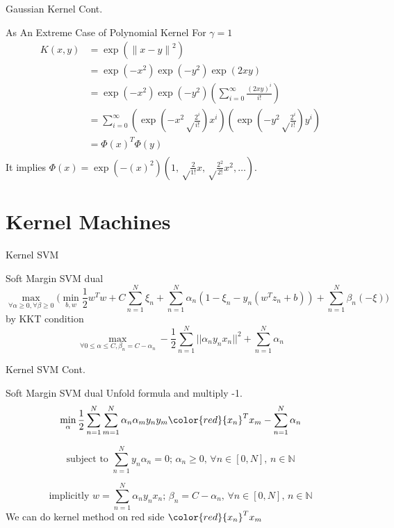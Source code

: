 \documentclass[10pt, compress]{beamer}
\begin{document}
\begin{frame}[fragile]{Gaussian Kernel Cont.}
  \begin{block}{As An Extreme Case of Polynomial Kernel}
    For \(\gamma = 1\)
    \begin{equation}
      \begin{split}
          K(x, y) &= \exp({\| x-y \|}^{2}) \\
                  &= \exp(-{x}^{2})\exp(-{y}^{2})\exp({2xy}) \\
                  &= \exp(-{x}^{2})\exp(-{y}^{2})(\sum_{i=0}^{\infty}\frac{{(2xy)}^{i}}{i!}) \\
                  &= \sum_{i=0}^{\infty}(\exp(-{x}^{2}\sqrt\frac{2^{i}}{i!}){x}^{i})(\exp(-{y}^{2}\sqrt\frac{2^{i}}{i!}){y}^{i}) \\
                  &= \Phi{(x)}^{T}\Phi(y)\\
      \end{split}
    \end{equation}
    It implies \(\Phi(x) = \exp(-{(x)}^{2})(1, \sqrt\frac{2}{1!}x, \sqrt\frac{2^{2}}{2!}x^{2}, \dots)\).
  \end{block}
\end{frame}

\section{Kernel Machines}

\begin{frame}[fragile]{Kernel SVM}
  \begin{block}{Soft Margin SVM dual}
    \[
      \max_{\forall \alpha \geq 0, \forall \beta \geq 0}\big(\min_{b, w} \frac{1}{2}{w}^{T}w + C\sum_{n=1}^{N}{\xi}_{n} + \sum_{n=1}^{N} {\alpha}_{n}(1-{\xi}_{n}-{y}_{n}({w}^{T}{z}_{n} + b)) + \sum_{n=1}^{N}{\beta}_{n}(-\xi)\big)
    \]
    by KKT condition
    \[
      \max_{\forall 0 \leq \alpha \leq C, {\beta}_{n} = C-\alpha_{n}} -\frac{1}{2}\sum_{n=1}^{N}{||{\alpha}_{n}y_{n}x_{n}||}^{2} + \sum_{n=1}^{N}{\alpha}_{n}
    \]
  \end{block}
\end{frame}

\begin{frame}[fragile]{Kernel SVM Cont.}
  \begin{block}{Soft Margin SVM dual}
    Unfold formula and multiply -1.
    \[
      \min_{\alpha} \frac{1}{2}\sum_{n=1}^{N}\sum_{m=1}^{N}{\alpha}_{n}{\alpha}_{m}y_{n}y_{m}{\color{red}{x_{n}}^{T}x_{m}} - \sum_{n=1}^{N}{\alpha}_{n}
    \]

    \[
      \text{subject to  } \sum_{n=1}^{N}y_n{\alpha}_{n} = 0 \text{; } {\alpha}_{n} \geq 0 \text{, } \forall n \in [0,N] \text{, } n \in \mathbb{N}
    \]

    \[
      \text{implicitly  } w =\sum_{n=1}^{N}{\alpha}_{n}y_{n}x_{n} \text{; } {\beta}_{n} = C - \alpha_{n} \text{, } \forall n \in [0,N] \text{, } n \in \mathbb{N}
    \]
    We can do kernel method on red side \({\color{red}{x_{n}}^{T}x_{m}}\)

  \end{block}
\end{frame}
\end{document}
